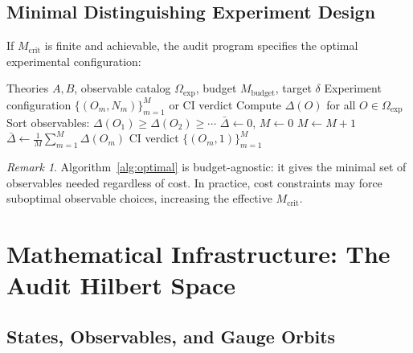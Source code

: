 \documentclass[12pt,a4paper]{article}
\theoremstyle{remark}
\newtheorem{remark}[theorem]{Remark}
\newcommand{\CI}{\textsf{CI}}
\begin{document}
\subsection{Minimal Distinguishing Experiment Design}

If $M_{\text{crit}}$ is finite and achievable, the audit program specifies the optimal experimental configuration:

\begin{algorithm}[H]
\caption{Optimal QG Distinguishing Experiment Design}
\label{alg:optimal}
\begin{algorithmic}[1]
\Require Theories $A, B$, observable catalog $\Omega_{\text{exp}}$, budget $M_{\text{budget}}$, target $\delta$
\Ensure Experiment configuration $\{(O_m, N_m)\}_{m=1}^{M}$ or \CI{} verdict
\State Compute $\Delta(O)$ for all $O \in \Omega_{\text{exp}}$
\State Sort observables: $\Delta(O_1) \geq \Delta(O_2) \geq \cdots$
\State $\bar{\Delta} \gets 0$, $M \gets 0$
    \State $M \gets M + 1$
    \State $\bar{\Delta} \gets \frac{1}{M} \sum_{m=1}^{M} \Delta(O_m)$
\EndWhile
{}
    \State \Return \CI{} verdict 
\Else
    \State \Return $\{(O_m, 1)\}_{m=1}^{M}$ 
\EndIf
\end{algorithmic}
\end{algorithm}

\begin{remark}
\label{rem:budget_agnostic}
Algorithm~\ref{alg:optimal} is budget-agnostic: it gives the minimal set of observables needed regardless of cost. In practice, cost constraints may force suboptimal observable choices, increasing the effective $M_{\text{crit}}$.
\end{remark}


\section{Mathematical Infrastructure: The Audit Hilbert Space}
\label{sec:math_infra}

\subsection{States, Observables, and Gauge Orbits}
\end{document}
